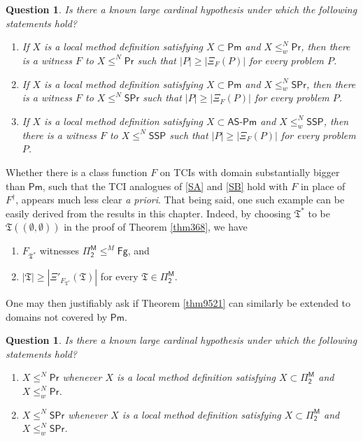\documentclass[12pt, twoside]{memoir}
\numberwithin{equation}{section}
\newtheorem{ques}[thm]{Question}
\theoremstyle{definition}
\theoremstyle{remark}
\theoremstyle{definition}
\theoremstyle{definition}
\theoremstyle{definition}
\theoremstyle{remark}
\begin{document}
\begin{ques}
Is there a known large cardinal hypothesis under which the following statements hold?
\begin{enumerate}[label=(\arabic*)]
    \item If $X$ is a local method definition satisfying $X \subset \mathsf{Pm}$ and $X \leq^N_w \mathsf{Pr}$, then there is a witness $F$ to $X \leq^N \mathsf{Pr}$ such that $|P| \geq |\Xi_{F}(P)|$ for every problem $P$.
    \item If $X$ is a local method definition satisfying $X \subset \mathsf{Pm}$ and $X \leq^N_w \mathsf{SPr}$, then there is a witness $F$ to $X \leq^N \mathsf{SPr}$ such that $|P| \geq |\Xi_{F}(P)|$ for every problem $P$.
    \item If $X$ is a local method definition satisfying $X \subset \mathsf{AS\text{-}Pm}$ and $X \leq^N_w \mathsf{SSP}$, then there is a witness $F$ to $X \leq^N \mathsf{SSP}$ such that $|P| \geq |\Xi_{F}(P)|$ for every problem $P$.
\end{enumerate}
\end{ques}

Whether there is a class function $F$ on TCIs with domain substantially bigger than $\mathsf{Pm}$, such that the TCI analogues of \ref{SA} and \ref{SB} hold with $F$ in place of $F^{\dagger}$, appears much less clear \textit{a priori}. That being said, one such example can be easily derived from the results in this chapter. Indeed, by choosing $\mathfrak{T}^*$ to be $\mathfrak{T}((\emptyset, \emptyset))$ in the proof of Theorem \ref{thm368}, we have
\begin{enumerate}[label=(\Alph*)$'_{F_{\mathfrak{T}^*}}$,leftmargin=45pt]
    \item\label{SA'} $F_{\mathfrak{T}^*}$ witnesses $\mathsf{\Pi^M_2} \leq^M \mathsf{Fg}$, and
    \item\label{SB'} $|\mathfrak{T}| \geq |\Xi'_{F_{\mathfrak{T}^*}}(\mathfrak{T})|$ for every $\mathfrak{T} \in \mathsf{\Pi^M_2}$.
\end{enumerate}

One may then justifiably ask if Theorem \ref{thm9521} can similarly be extended to domains not covered by $\mathsf{Pm}$.

\begin{ques}\label{q9527}
Is there a known large cardinal hypothesis under which the following statements hold?
\begin{enumerate}[label=(\arabic*)]
    \item $X \leq^N \mathsf{Pr}$ whenever $X$ is a local method definition satisfying $X \subset \mathsf{\Pi^M_2}$ and $X \leq^N_w \mathsf{Pr}$.
    \item $X \leq^N \mathsf{SPr}$ whenever $X$ is a local method definition satisfying $X \subset \mathsf{\Pi^M_2}$ and $X \leq^N_w \mathsf{SPr}$.
\end{enumerate}
\end{ques}
\end{document}
